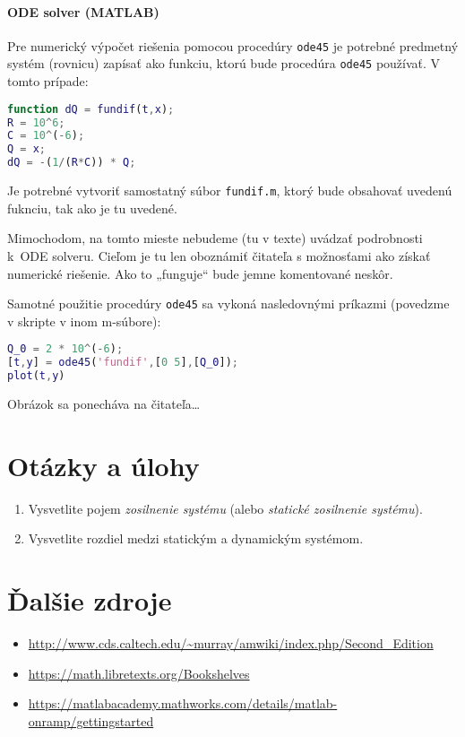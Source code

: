 \documentclass[a4paper, 10pt, ]{article}
\begin{document}
\paragraph{ODE solver (MATLAB)}

Pre numerický výpočet riešenia pomocou procedúry \verb|ode45| je potrebné predmetný systém (rovnicu) zapísať ako funkciu, ktorú bude procedúra \verb|ode45| používať. V tomto prípade:
\begin{lstlisting}[language=Matlab,]
function dQ = fundif(t,x);
R = 10^6;
C = 10^(-6);
Q = x;
dQ = -(1/(R*C)) * Q;
\end{lstlisting}
Je potrebné vytvoriť samostatný súbor \verb|fundif.m|, ktorý bude obsahovať uvedenú fuknciu, tak ako je tu uvedené.

Mimochodom, na tomto mieste nebudeme (tu v texte) uvádzať podrobnosti k~ODE solveru. Cieľom je tu len oboznámiť čitateľa s možnosťami ako získať numerické riešenie. Ako to „funguje“ bude jemne komentované neskôr.

Samotné použitie procedúry \verb|ode45| sa vykoná nasledovnými príkazmi (povedzme v skripte v inom m-súbore):
\begin{lstlisting}[language=Matlab,]
Q_0 = 2 * 10^(-6);
[t,y] = ode45('fundif',[0 5],[Q_0]);
plot(t,y)
\end{lstlisting}
Obrázok sa ponecháva na čitateľa\ldots









\section{Otázky a úlohy}

\begin{enumerate}[leftmargin=0pt, labelsep=3mm, itemsep=0pt]
	\item Vysvetlite pojem \emph{zosilnenie systému} (alebo \emph{statické zosilnenie systému}).
    \item Vysvetlite rozdiel medzi statickým a dynamickým systémom.
\end{enumerate}



\renewcommand{\refname}{Odporúčaná literatúra}

\nocite{*}
{}






\section*{Ďalšie zdroje}

\begin{itemize}[leftmargin=0pt, labelsep=3mm, itemsep=0pt]
    \item \url{http://www.cds.caltech.edu/~murray/amwiki/index.php/Second_Edition}
	\item \url{https://math.libretexts.org/Bookshelves}
	\item \url{https://matlabacademy.mathworks.com/details/matlab-onramp/gettingstarted}
\end{itemize}
\end{document}
